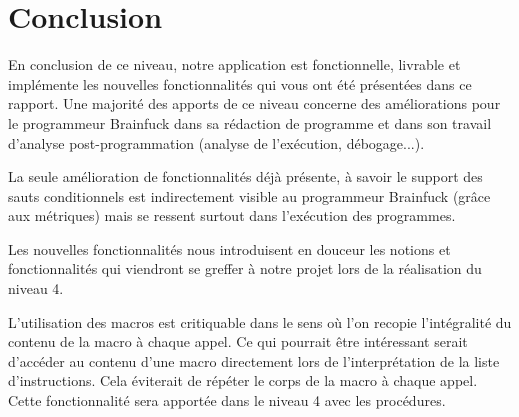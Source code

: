 \documentclass{article}
\begin{document}
\section{Conclusion}
En conclusion de ce niveau, notre application est fonctionnelle, livrable et implémente les nouvelles fonctionnalités qui vous ont été présentées dans ce rapport. Une majorité des apports de ce niveau concerne des améliorations pour le programmeur Brainfuck dans sa rédaction de programme et dans son travail d'analyse post-programmation (analyse de l'exécution, débogage...). 

La seule amélioration de fonctionnalités déjà présente, à savoir le support des sauts conditionnels est indirectement visible au programmeur Brainfuck (grâce aux métriques) mais se ressent surtout dans l'exécution des programmes. 

Les nouvelles fonctionnalités nous introduisent en douceur les notions et fonctionnalités qui viendront se greffer à notre projet lors de la réalisation du niveau 4. 

L'utilisation des macros est critiquable dans le sens où l'on recopie l'intégralité du contenu de la macro à chaque appel. Ce qui pourrait être intéressant serait d'accéder au contenu d'une macro directement lors de l'interprétation de la liste d'instructions. Cela éviterait de répéter le corps de la macro à chaque appel. Cette fonctionnalité sera apportée dans le niveau 4 avec les procédures.
\end{document}
